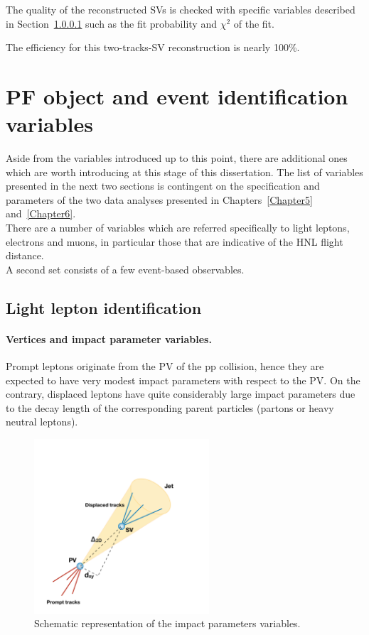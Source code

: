 The quality of the reconstructed SVs is checked with specific
variables described in Section~\ref{sec:c2IP} such as the fit
probability and $\chi^2$ of the fit. 

The efficiency for this two-tracks-SV reconstruction is nearly 100\%.


\section{PF object and event identification
  variables}\label{sec:c2variables}
Aside from the variables introduced up to this point, there are additional
ones which are worth introducing at this stage of this dissertation. 
The list of variables presented in the next two sections is
contingent on the specification and parameters of the two data analyses presented in Chapters~\ref{Chapter5}
and~\ref{Chapter6}.\\
There are a number of variables which are referred specifically to light
leptons, electrons and muons, in particular those that are indicative
of the HNL flight distance.\\
A second set consists of a few event-based observables. 



\subsection*{Light lepton
  identification} \label{sec:c2leptonvariables}

\paragraph{Vertices and impact parameter variables.} \label{sec:c2IP}
Prompt leptons originate from the PV of the pp collision, hence they
are expected to have very modest impact parameters with respect to the
PV. On the contrary, displaced leptons have
quite considerably large impact parameters due to the decay length of the
corresponding parent particles (partons or heavy neutral leptons).

\begin{figure}[h!]
\centering
  \includegraphics[clip,trim=1cm 0cm 3cm 4cm, width=0.58\textwidth]{Figures/c2/grafico.pdf}
  \caption{Schematic representation of the impact parameters variables.}
  \label{fig:impact}
\end{figure}

